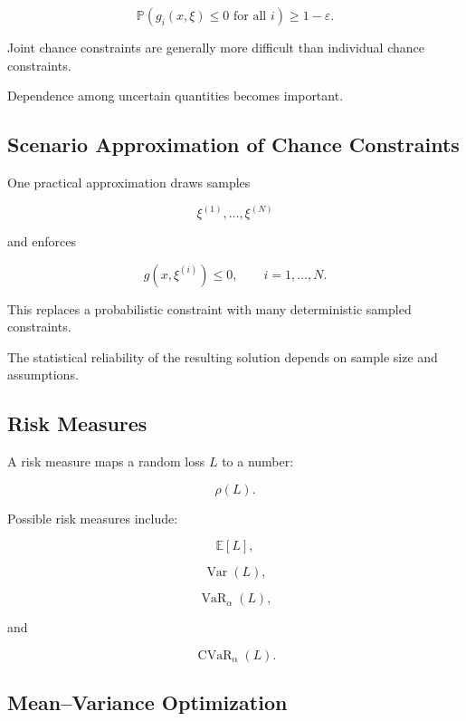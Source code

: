 \[
\boxed{
\mathbb{P}
\left(
g_i(x,\xi)\leq0
\text{ for all }i
\right)
\geq
1-\varepsilon.
}
\]

Joint chance constraints are generally more difficult than individual
chance constraints.

Dependence among uncertain quantities becomes important.

\subsection{Scenario Approximation of Chance Constraints}
\label{subsec:scenario-approximation-chance}

One practical approximation draws samples

\[
\xi^{(1)},\ldots,\xi^{(N)}
\]

and enforces

\[
\boxed{
g
(
x,\xi^{(i)}
)
\leq0,
\qquad
i=1,\ldots,N.
}
\]

This replaces a probabilistic constraint with many deterministic sampled
constraints.

The statistical reliability of the resulting solution depends on sample
size and assumptions.

\subsection{Risk Measures}
\label{subsec:risk-measures-stochastic}

A risk measure maps a random loss \(L\) to a number:

\[
\boxed{
\rho(L).
}
\]

Possible risk measures include:

\[
\boxed{
\mathbb{E}[L],
}
\]

\[
\boxed{
\operatorname{Var}(L),
}
\]

\[
\boxed{
\operatorname{VaR}_{\alpha}(L),
}
\]

and

\[
\boxed{
\operatorname{CVaR}_{\alpha}(L).
}
\]

\subsection{Mean--Variance Optimization}
\label{subsec:mean-variance-optimization}

